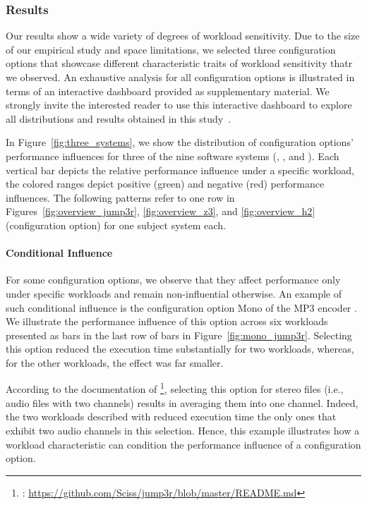 {{{\subsubsection{Results}\label{sec:results2}


	
Our results show a wide variety of degrees of workload sensitivity. Due to the size of our empirical study and space limitations, we selected three configuration options that showcase different characteristic traits of workload sensitivity thatr we observed. An exhaustive analysis for all configuration options is illustrated in terms of an interactive dashboard provided as supplementary material. We strongly invite the interested reader to use this interactive dashboard to explore all distributions and results obtained in this study~\cite{muhlbauer_workload_2023_companion}.

{In Figure~\ref{fig:three_systems}, we show the distribution of configuration options' performance influences for three of the nine software systems (\jumper, \zdrei, and \htwo). {\color{black}Each vertical bar depicts the relative performance influence under a specific workload, the colored ranges depict positive (green) and negative (red) performance influences. The following patterns refer to one row in Figures~\ref{fig:overview_jump3r}, \ref{fig:overview_z3}, and \ref{fig:overview_h2} (configuration option) for one subject system each.}

\paragraph{Conditional Influence}\label{sec:conditional_influence} For some configuration options, we observe that they affect performance only under specific workloads and remain non-influential otherwise. An example of such conditional influence is the configuration option \textsf{Mono} of the MP3 encoder \jumper. We illustrate the performance influence of this option across six workloads presented as bars in the last row of bars in Figure~\ref{fig:mono_jump3r}. Selecting this option reduced the execution time substantially for two workloads, whereas, for the other workloads, the effect was far smaller.

According to the documentation of \jumper\footnote{\jumper: \url{https://github.com/Sciss/jump3r/blob/master/README.md}}, selecting this option for stereo files (i.e., audio files with two channels) results in averaging them into one channel. Indeed, the two workloads described with reduced execution time the only ones that exhibit two audio channels in this selection. Hence, this example illustrates how a workload  characteristic can condition the performance influence of a configuration option. 

}}}}
